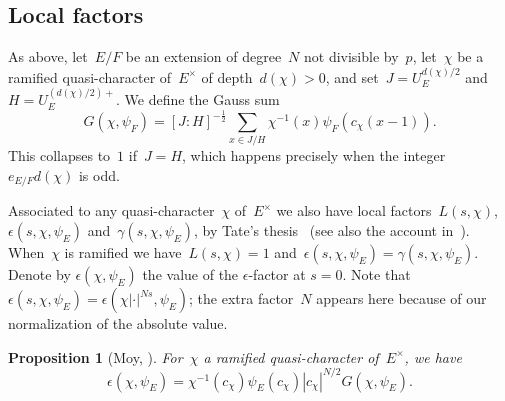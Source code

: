 \documentclass[12pt]{amsart}
\newcommand{\tr}{\operatorname{tr}}
\newtheorem{prop}[thm]{Proposition}
\newtheorem{prop}[equation]{Proposition}
\begin{document}

\subsection{Local factors}

As above, let~$E/F$ be an extension of degree~$N$ not divisible by~$p$, let~$\chi$ be a ramified quasi-character of~$E^\times$ of depth~$d(\chi)> 0$, and set~$J = U_E^{d(\chi)/2}$ and $H = U_E^{(d(\chi)/2)+}$. We define the Gauss sum 
\[
G(\chi,\psi_F)=[J:H]^{-\frac{1}{2}} \sum_{x \in J/H} \chi^{-1}(x)\psi_F(c_{\chi}(x-1)).
\]
This collapses to~$1$ if~$J=H$, which happens precisely when the integer~$e_{E/F}d(\chi)$ is odd.

Associated to any quasi-character~$\chi$ of~$E^\times$ we also have local factors~$L(s,\chi)$,~$\epsilon(s,\chi,\psi_E)$ and~$\gamma(s,\chi,\psi_E)$, by Tate's thesis~\cite{T50} (see also the account in~\cite[\S23]{BH06}). When~$\chi$ is ramified we have~$L(s,\chi)=1$ and~$\epsilon(s,\chi,\psi_E)=\gamma(s,\chi,\psi_E)$. Denote by $\epsilon(\chi, \psi_E)$ the value of the $\epsilon$-factor at $s=0$. Note that $\epsilon(s, \chi, \psi_E)=\epsilon(\chi \lvert \cdot \rvert^{Ns}, \psi_E)$; the extra factor~$N$ appears here because of our normalization of the absolute value.

\begin{prop}[{Moy, \cite[(2.3.17)]{M86}}]\label{prop:epsilonfactorformula}
For~$\chi$ a ramified quasi-character of~$E^\times$, we have
\[
\epsilon(\chi, \psi_E) = \chi^{-1}(c_{\chi}) \psi_E(c_{\chi}) |c_{\chi}|^{N/2} G(\chi,\psi_E).
\]
\end{prop}
\end{document}
